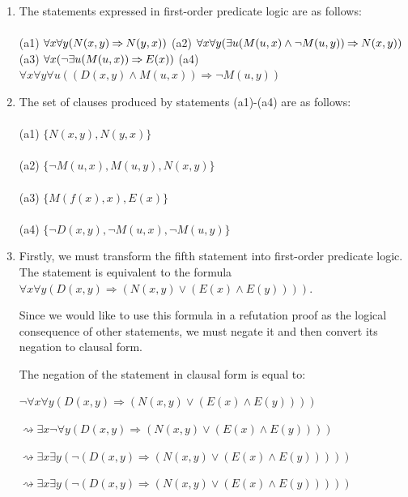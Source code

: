 \documentclass[12pt]{article}
\newcommand{\impl}{\mathbin{\Rightarrow}}
\begin{document}
\begin{enumerate}
  \item The statements expressed in first-order predicate logic are as follows:\\\\
	  (a1) $\forall x \forall y(N(x,y) \impl N(y,x))\\\\$
        (a2) $\forall x \forall y (\exists u(M(u,x) \land \neg M(u,y)) \impl N(x,y))\\\\$
        (a3) $\forall x(\neg \exists u(M(u,x)) \impl E(x))\\\\$
        (a4) $\forall x \forall y \forall u((D(x,y) \land M(u,x)) \impl \neg M(u,y))$\\

  \item The set of clauses produced by statements (a1)-(a4) are as follows:\\
\\(a1) $\{N(x,y), N(y,x)\}$\\
\\(a2) $\{\neg M(u,x), M(u,y), N(x,y)\}$\\
\\(a3) $\{M(f(x), x), E(x)\}$\\
\\(a4) $\{\neg D(x,y), \neg M(u,x), \neg M(u,y)\}$

  \bigskip
  \item Firstly, we must transform the fifth statement into first-order predicate logic. The statement is equivalent to the formula $\forall x \forall y(D(x,y) \impl (N(x,y) \lor (E(x) \land E(y))))$.

\bigskip
Since we would like to use this formula in a refutation proof as the logical consequence of other statements, we must negate it and then convert its negation to clausal form.

\bigskip
The negation of the statement in clausal form is equal to:

$\neg \forall x \forall y(D(x,y) \impl (N(x,y) \lor (E(x) \land E(y))))$

$\rightsquigarrow \exists x \neg \forall y(D(x,y) \impl (N(x,y) \lor (E(x) \land E(y))))$

$\rightsquigarrow \exists x \exists y(\neg (D(x,y) \impl (N(x,y) \lor (E(x) \land E(y)))))$

$\rightsquigarrow \exists x \exists y(\neg (D(x,y) \impl (N(x,y) \lor (E(x) \land E(y)))))$


\end{enumerate}
\end{document}
